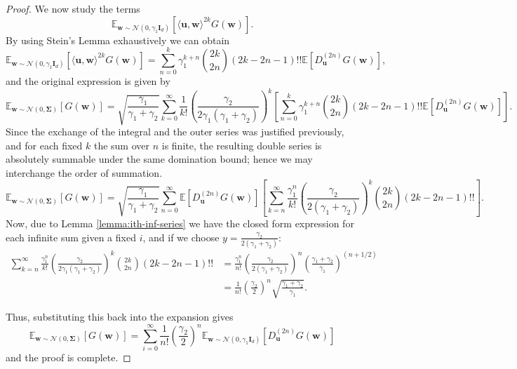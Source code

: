 \begin{proof}
    We now study the terms
    \[
         \mathbb E_{\bm w \sim \mathcal N(0, \gamma_1\bm I_d)}[\langle \bm u, \bm w\rangle^{2k}G(\bm w)].
    \]
    By using Stein's Lemma exhaustively we can obtain
    \[
        \mathbb E_{\bm w \sim \mathcal N(0, \gamma_1\bm I_d)}[\langle \bm u, \bm w\rangle^{2k}G(\bm w)] = \sum_{n=0}^k \gamma_1^{k+n}\binom{2k}{2n}(2k -2n-1)!! \mathbb{E}[ D_{\bm u}^{(2n)} G(\bm{w})],
    \]
    and the original expression is given by
    \[
        \mathbb E_{\bm w \sim \mathcal N(0, \bm \Sigma)}[G(\bm w)] = \sqrt{\frac{\gamma_1}{\gamma_1+\gamma_2}}\sum_{k=0}^\infty\frac{1}{k!}\left(\frac{\gamma_2}{2\gamma_1(\gamma_1+\gamma_2)}\right)^k\left[\sum_{n=0}^k \gamma_1^{k+n}\binom{2k}{2n}(2k -2n-1)!! \mathbb{E}[ D_{\bm u}^{(2n)} G(\bm{w})]\right].
    \]
    Since the exchange of the integral and the outer series was justified previously, and for each fixed $k$ the sum over $n$ is finite, the resulting double series is absolutely summable under the same domination bound; hence we may interchange the order of summation.
    \[
        \mathbb E_{\bm w \sim \mathcal N(0, \bm \Sigma)}[G(\bm w)] = \sqrt{\frac{\gamma_1}{\gamma_1+\gamma_2}}\sum_{n=0}^\infty \mathbb{E}[ D_{\bm u}^{(2n)} G(\bm{w})]\left[\sum_{k=n}^\infty\frac{\gamma_1^{n}}{k!}\left(\frac{\gamma_2}{2(\gamma_1+\gamma_2)}\right)^k\binom{2k}{2n}(2k -2n-1)!! \right].
    \]
    Now, due to Lemma \ref{lemma:ith-inf-series} we have the closed form expression for each infinite sum given a fixed $i$, and if we choose $y = \frac{\gamma_2}{2(\gamma_1+\gamma_2)}$:
    \begin{align*}    
        \sum_{k=n}^\infty\frac{\gamma_1^{n}}{k!}\left(\frac{\gamma_2}{2\gamma_1(\gamma_1+\gamma_2)}\right)^k\binom{2k}{2n}(2k -2n-1)!! &= \frac{\gamma_1^{n}}{n!}\left(\frac{\gamma_2}{2(\gamma_1+\gamma_2)}\right)^n\left(\frac{\gamma_1+\gamma_2}{\gamma_1}\right)^{(n+1/2)}\\
        &=\frac{1}{n!}\left(\frac{\gamma_2}{2}\right)^n\sqrt{\frac{\gamma_1+\gamma_2}{\gamma_1}}.
    \end{align*}
    
    Thus, substituting this back into the expansion gives
    \[
        \mathbb E_{\bm w \sim \mathcal N(0, \bm \Sigma)}[G(\bm w)] = \sum_{i=0}^\infty \frac{1}{n!}\left(\frac{\gamma_2}{2}\right)^n\mathbb{E}_{\bm w \sim \mathcal N(0, \gamma_1\bm I_d)}[ D_{\bm u}^{(2n)} G(\bm{w})]
    \]
    and the proof is complete.
\end{proof}
